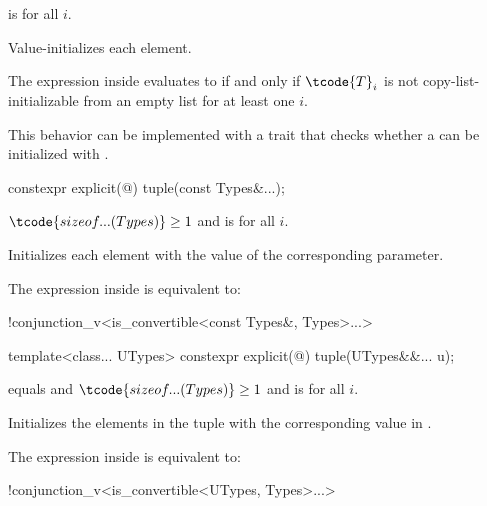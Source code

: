 \begin{itemdescr}
\pnum
\constraints
{} is  for all $i$.

\pnum
\effects
Value-initializes each element.

\pnum
\remarks
The expression inside  evaluates to 
if and only if $\tcode{T}_i$ is not
copy-list-initializable from an empty list
for at least one $i$.
\begin{note}
This behavior can be implemented with a trait that checks whether
a  can be initialized with \tcode{\{\}}.
\end{note}
\end{itemdescr}

%
\begin{itemdecl}
constexpr explicit(@\seebelow@) tuple(const Types&...);
\end{itemdecl}

\begin{itemdescr}
\pnum
\constraints
$\tcode{sizeof...(Types)} \geq 1$ and
 is  for all $i$.

\pnum
\effects
Initializes each element with the value of the
corresponding parameter.

\pnum
\remarks
The expression inside  is equivalent to:
\begin{codeblock}
!conjunction_v<is_convertible<const Types&, Types>...>
\end{codeblock}
\end{itemdescr}

%
\begin{itemdecl}
template<class... UTypes> constexpr explicit(@\seebelow@) tuple(UTypes&&... u);
\end{itemdecl}

\begin{itemdescr}
\pnum
\constraints
{} equals  and
$\tcode{sizeof...(Types)} \geq 1$ and
 is  for all $i$.

\pnum
\effects
Initializes the elements in the tuple with the
corresponding value in .

\pnum
\remarks
The expression inside  is equivalent to:
\begin{codeblock}
!conjunction_v<is_convertible<UTypes, Types>...>
\end{codeblock}
\end{itemdescr}

